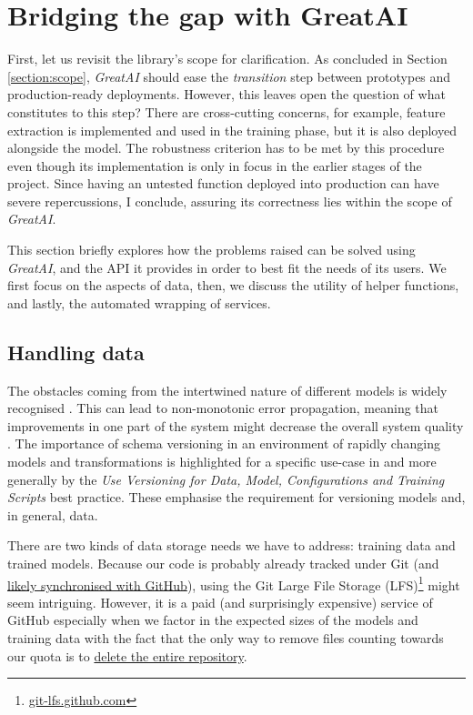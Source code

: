 \section{Bridging the gap with GreatAI}

First, let us revisit the library's scope for clarification. As concluded in Section \ref{section:scope}, \textit{GreatAI} should ease the \textit{transition} step between prototypes and production-ready deployments. However, this leaves open the question of what constitutes to this step? There are cross-cutting concerns, for example, feature extraction is implemented and used in the training phase, but it is also deployed alongside the model. The robustness criterion has to be met by this procedure even though its implementation is only in focus in the earlier stages of the project. Since having an untested function deployed into production can have severe repercussions, I conclude, assuring its correctness lies within the scope of \textit{GreatAI}.

This section briefly explores how the problems raised can be solved using \textit{GreatAI}, and the API it provides in order to best fit the needs of its users. We first focus on the aspects of data, then, we discuss the utility of helper functions, and lastly, the automated wrapping of services.

\subsection{Handling data} \label{subsection:large-file}

The obstacles coming from the intertwined nature of different models is widely recognised \cite{haakman2021ai,amershi2019software,sculley2015hidden}. This can lead to non-monotonic error propagation, meaning that improvements in one part of the system might decrease the overall system quality \cite{amershi2019software}. The importance of schema versioning in an environment of rapidly changing models and transformations is highlighted for a specific use-case in \cite{van2017versioning} and more generally by the \textit{Use Versioning for Data, Model, Configurations and Training Scripts} best practice. These emphasise the requirement for versioning models and, in general, data.

There are two kinds of data storage needs we have to address: training data and trained models. Because our code is probably already tracked under Git (and \href{https://octoverse.github.com/#lets-look-back-at-the-code-and-communities-built-on-git-hub-this-year}{likely synchronised with GitHub}), using the Git Large File Storage (LFS)\footnote{\href{https://git-lfs.github.com/}{git-lfs.github.com}} might seem intriguing. However, it is a paid (and surprisingly expensive) service of GitHub especially when we factor in the expected sizes of the models and training data with the fact that the only way to remove files counting towards our quota is to \href{https://docs.github.com/en/repositories/working-with-files/managing-large-files/removing-files-from-git-large-file-storage#git-lfs-objects-in-your-repository}{delete the entire repository}.

